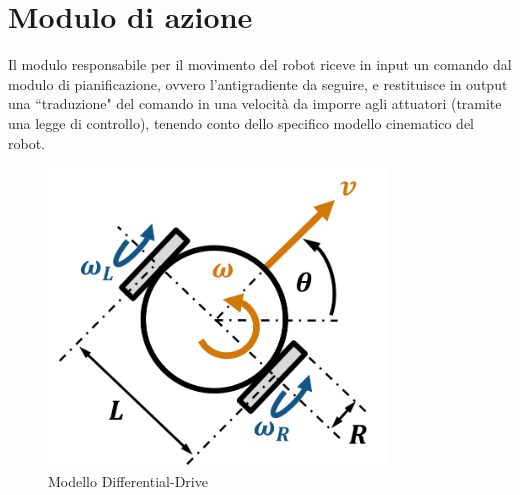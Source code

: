 \documentclass[14pt,a4paper]{extarticle}
\begin{document}
\newpage
\section{Modulo di azione}
Il modulo responsabile per il movimento del robot riceve in input un comando dal modulo di pianificazione, ovvero l'antigradiente da seguire, e restituisce in output una ``traduzione" del comando in una velocità da imporre agli attuatori (tramite una legge di controllo), tenendo conto dello specifico modello cinematico del robot. 
\begin{figure}[h]
\centering
\caption{Modello Differential-Drive} 
\label{dd}
\includegraphics[width=0.8\textwidth]{DD.png}
\end{figure}
\end{document}
